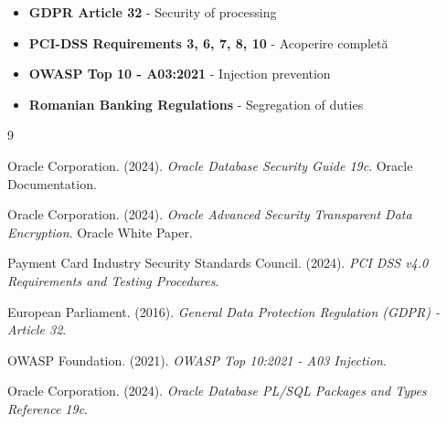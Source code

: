 \documentclass[12pt,a4paper]{article}
\begin{document}
\begin{itemize}
    \item[$\checkmark$] \textbf{GDPR Article 32} - Security of processing
    \item[$\checkmark$] \textbf{PCI-DSS Requirements 3, 6, 7, 8, 10} - Acoperire completă
    \item[$\checkmark$] \textbf{OWASP Top 10 - A03:2021} - Injection prevention
    \item[$\checkmark$] \textbf{Romanian Banking Regulations} - Segregation of duties
\end{itemize}

\newpage
\begin{thebibliography}{9}

Oracle Corporation. (2024).
\textit{Oracle Database Security Guide 19c}.
Oracle Documentation.

Oracle Corporation. (2024).
\textit{Oracle Advanced Security Transparent Data Encryption}.
Oracle White Paper.

Payment Card Industry Security Standards Council. (2024).
\textit{PCI DSS v4.0 Requirements and Testing Procedures}.

European Parliament. (2016).
\textit{General Data Protection Regulation (GDPR) - Article 32}.

OWASP Foundation. (2021).
\textit{OWASP Top 10:2021 - A03 Injection}.

Oracle Corporation. (2024).
\textit{Oracle Database PL/SQL Packages and Types Reference 19c}.

\end{thebibliography}
\end{document}
